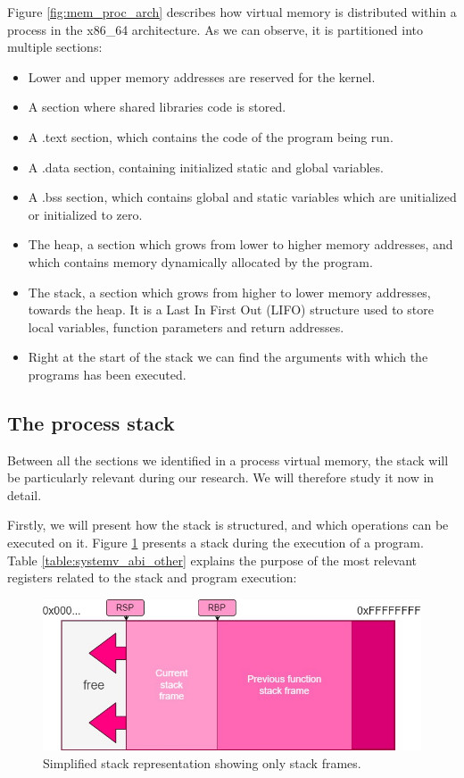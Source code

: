\documentclass[12pt]{report} %
\begin{document}
Figure \ref{fig:mem_proc_arch} describes how virtual memory is distributed within a process in the x86\_64 architecture. As we can observe, it is partitioned into multiple sections:
\begin{itemize}
\item Lower and upper memory addresses are reserved for the kernel.
\item A section where shared libraries code is stored.
\item A .text section, which contains the code of the program being run.
\item A .data section, containing initialized static and global variables.
\item A .bss section, which contains global and static variables which are unitialized or initialized to zero.
\item The heap, a section which grows from lower to higher memory addresses, and which contains memory dynamically allocated by the program.
\item The stack, a section which grows from higher to lower memory addresses, towards the heap. It is a Last In First Out (LIFO) structure used to store local variables, function parameters and return addresses.
\item Right at the start of the stack we can find the arguments with which the programs has been executed.
\end{itemize}

\subsection{The process stack} \label{subsection:stack}
Between all the sections we identified in a process virtual memory, the stack will be particularly relevant during our research. We will therefore study it now in detail. 

Firstly, we will present how the stack is structured, and which operations can be executed on it. Figure \ref{fig:stack_pres} presents a stack during the execution of a program. Table \ref{table:systemv_abi_other} explains the purpose of the most relevant registers related to the stack and program execution:

\begin{figure}[H]
	\centering
	\includegraphics[width=14cm]{stack_pres.jpg}
	\caption{Simplified stack representation showing only stack frames.}
	\label{fig:stack_pres}
\end{figure}
\end{document}
